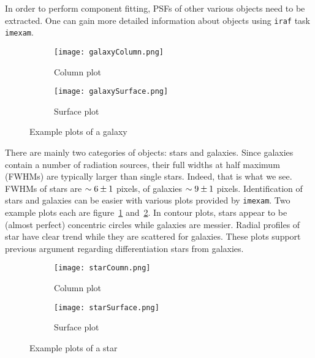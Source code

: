 In order to perform component fitting, PSFs of other various objects need to be extracted. One can gain more detailed information about objects using \verb|iraf| task \verb|imexam|. 

\begin{figure}[ht]
   \centering
   \begin{subfigure}[t]{0.5\textwidth}
   \begin{center}
   \texttt{[image: galaxyColumn.png]}
   \end{center}
   \caption{Column plot}
   \end{subfigure}%
   \begin{subfigure}[t]{0.5\textwidth}
   \begin{center}
   \texttt{[image: galaxySurface.png]}
   \end{center}
   \caption{Surface plot}
   \end{subfigure}
   \caption{Example plots of a galaxy}%
   \label{fig:galaxyPlots}
\end{figure}

There are mainly two categories of objects: stars and galaxies. Since galaxies contain a number of radiation sources, their full widths at half maximum (FWHMs) are typically larger than single stars. Indeed, that is what we see. FWHMs of stars are $\sim\num{6+-1}$ pixels, of galaxies $\sim\num{9+-1}$ pixels. Identification of stars and galaxies can be easier with various plots provided by \verb|imexam|. Two example plots each are figure~\ref{fig:galaxyPlots} and~\ref{fig:starPlots}. In contour plots, stars appear to be (almost perfect) concentric circles while galaxies are messier. Radial profiles of star have clear trend while they are scattered for galaxies. These plots support previous argument regarding differentiation stars from galaxies.
\begin{figure}[ht]
   \centering
   \begin{subfigure}[t]{0.5\textwidth}
   \begin{center}
   \texttt{[image: starCoumn.png]}
   \end{center}
   \caption{Column plot}
   \end{subfigure}%
   \begin{subfigure}[t]{0.5\textwidth}
   \begin{center}
   \texttt{[image: starSurface.png]}
   \end{center}
   \caption{Surface plot}
   \end{subfigure}
   \caption{Example plots of a star}%
   \label{fig:starPlots}
\end{figure}

